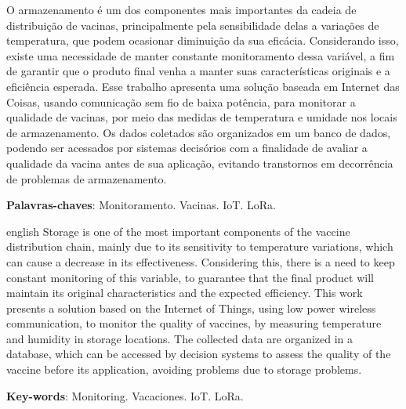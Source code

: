 \setlength{\absparsep}{18pt} %
\begin{resumo}
  O armazenamento é um dos componentes mais importantes da cadeia de distribuição de vacinas, principalmente pela sensibilidade delas a variações de temperatura, que podem ocasionar diminuição da sua eficácia. Considerando isso, existe uma necessidade de manter constante monitoramento dessa variável, a fim de garantir que o produto final venha a manter suas características originais e a eficiência esperada. Esse trabalho apresenta uma solução baseada em Internet das Coisas, usando comunicação sem fio de baixa potência, para monitorar a qualidade de vacinas, por meio das medidas de temperatura e umidade nos locais de armazenamento. Os dados coletados são organizados em um banco de dados, podendo ser acessados por sistemas decisórios com a finalidade de avaliar a qualidade da vacina antes de sua aplicação, evitando transtornos em decorrência de problemas de armazenamento.

  \textbf{Palavras-chaves}: Monitoramento. Vacinas. IoT. LoRa.
\end{resumo}

\begin{resumo}[Abstract]
  \begin{otherlanguage*}{english}
    Storage is one of the most important components of the vaccine distribution chain, mainly due to its sensitivity to temperature variations, which can cause a decrease in its effectiveness. Considering this, there is a need to keep constant monitoring of this variable, to guarantee that the final product will maintain its original characteristics and the expected efficiency. This work presents a solution based on the Internet of Things, using low power wireless communication, to monitor the quality of vaccines, by measuring temperature and humidity in storage locations. The collected data are organized in a database, which can be accessed by decision systems to assess the quality of the vaccine before its application, avoiding problems due to storage problems.

    \noindent
    \textbf{Key-words}: Monitoring. Vacaciones. IoT. LoRa.
  \end{otherlanguage*}
\end{resumo}
